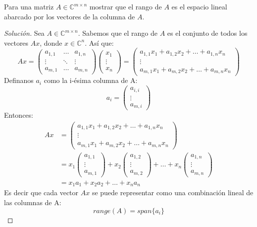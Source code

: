 \documentclass[12pt]{book}
\newcommand{\C}{\mathbb{C}}
\newenvironment{solution}
  {\renewcommand\qedsymbol{$\square$}\begin{proof}[Solución]}
  {\end{proof}}
\begin{document}
\exercise Para una matriz $A\in\C^{m\times n}$ mostrar que el rango de $A$ es el espacio lineal abarcado por los vectores de la columna de $A$.
\begin{solution}
Sea $A\in\C^{m\times n}$. Sabemos que el rango de $A$ es el conjunto de todos los vectores $Ax$, donde $x\in\C^n$. Así que:
\[
Ax=\begin{pmatrix}
a_{1, 1} & \dots & a_{1, n}\\
\vdots & \ddots & \vdots\\
a_{m, 1} & \dots & a_{m, n}
\end{pmatrix}\begin{pmatrix}
x_1\\
\vdots\\
x_n
\end{pmatrix}=\begin{pmatrix}
a_{1,1}x_1+a_{1,2}x_2+\dots+a_{1,n}x_n\\
\vdots\\
a_{m,1}x_1+a_{m,2}x_2+\dots+a_{m,n}x_n
\end{pmatrix}
\]
Definanos $a_i$ como la i-ésima columna de A:
\[
a_i=\begin{pmatrix}
a_{i, i}\\
\vdots\\
a_{m, i}
\end{pmatrix}
\]
Entonces:
\begin{align*}
    Ax&=\begin{pmatrix}
a_{1,1}x_1+a_{1,2}x_2+\dots+a_{1,n}x_n\\
\vdots\\
a_{m,1}x_1+a_{m,2}x_2+\dots+a_{m,n}x_n
\end{pmatrix}\\
&= x_1\begin{pmatrix}
a_{1, 1}\\
\vdots\\
a_{m, 1}
\end{pmatrix} + x_2\begin{pmatrix}
a_{1, 2}\\
\vdots\\
a_{m, 2}
\end{pmatrix} + \dots + x_n\begin{pmatrix}
a_{1, n}\\
\vdots\\
a_{m, n}
\end{pmatrix}\\
&=x_1a_1+x_2a_2+\dots+x_na_n
\end{align*}
Es decir que cada vector $Ax$ se puede representar como una combinación lineal de las columnas de A:
\[
range(A)=span\{a_i\}
\]
\end{solution}
\end{document}
